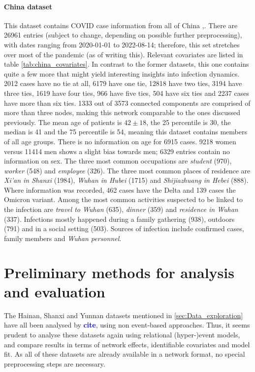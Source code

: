 \documentclass{article}
\newcommand{\add}[1]{\textbf{\textcolor{blue}{#1}}}
\begin{document}
	\paragraph{China dataset} This dataset contains COVID case information from all of China \cite{china_publication},\cite{china_data}. There are 26961 entries (subject to change, depending on possible further preprocessing), with dates ranging from 2020-01-01 to 2022-08-14; therefore, this set stretches over most of the pandemic (as of writing this). Relevant covariates are listed in table \ref{tab:china_covariates}. In contrast to the former datasets, this one contains quite a few more that might yield interesting insights into infection dynamics. 2012 cases have no tie at all, 6179 have one tie, 12818 have two ties, 3194 have three ties, 1619 have four ties, 966 have five ties, 504 have six ties and 2237 cases have more than six ties. 1333 out of 3573 connected components are comprised of more than three nodes, making this network comparable to the ones discussed previously. The mean age of patients is $42\pm18$, the 25 percentile is 30, the median is 41 and the 75 percentile is 54, meaning this dataset contains members of all age groups. There is no information on age for 6915 cases. 9218 women versus 11414 men shows a slight bias towards men; 6329 entries contain no information on sex. The three most common occupations are \emph{student} (970), \emph{worker} (548) and \emph{employee} (326). The three most common places of residence are \emph{Xi'an in Shanxi} (1984), \emph{Wuhan in Hubei} (1715) and \emph{Shijiazhuang in Hebei} (888). Where information was recorded, 462 cases have the Delta and 139 cases the Omicron variant. Among the most common activities suspected to be linked to the infection are \emph{travel to Wuhan} (635), \emph{dinner} (359) and \emph{residence in Wuhan} (337). Infections mostly happened during a family gathering (938), outdoors (791) and in a social setting (503). Sources of infection include confirmed cases, family members and \emph{Wuhan personnel}.
	
	\section{Preliminary methods for analysis and evaluation}
	\label{sec:Methods}
	The Hainan, Shanxi and Yunnan datasets mentioned in \ref{sec:Data_exploration} have all been analysed by \add{cite}, using non event-based approaches. Thus, it seems prudent to analyse these datasets again using relational (hyper-)event models, and compare results in terms of network effects, identifiable covariates and model fit. As all of these datasets are already available in a network format, no special preprocessing steps are necessary. 
	
\end{document}
